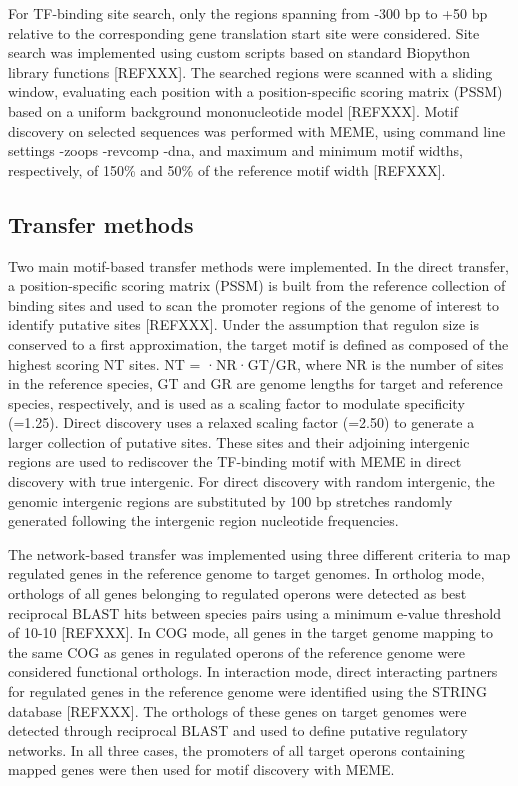 For TF-binding site search, only the regions spanning from -300 bp to +50 bp
relative to the corresponding gene translation start site were considered. Site
search was implemented using custom scripts based on standard Biopython library
functions [REFXXX]. The searched regions were scanned with a sliding window,
evaluating each position with a position-specific scoring matrix (PSSM) based
on a uniform background mononucleotide model [REFXXX]. Motif discovery on
selected sequences was performed with MEME, using command line settings -zoops
-revcomp -dna, and maximum and minimum motif widths, respectively, of 150\% and
50\% of the reference motif width [REFXXX].

\subsection{Transfer methods}

Two main motif-based transfer methods were implemented. In the direct transfer,
a position-specific scoring matrix (PSSM) is built from the reference
collection of binding sites and used to scan the promoter regions of the genome
of interest to identify putative sites [REFXXX]. Under the assumption that
regulon size is conserved to a first approximation, the target motif is defined
as composed of the highest scoring NT sites. NT = ·NR·GT/GR, where NR is the
number of sites in the reference species, GT and GR are genome lengths for
target and reference species, respectively, and is used as a scaling factor to
modulate specificity (=1.25). Direct discovery uses a relaxed scaling factor
(=2.50) to generate a larger collection of putative sites. These sites and
their adjoining intergenic regions are used to rediscover the TF-binding motif
with MEME in direct discovery with true intergenic. For direct discovery with
random intergenic, the genomic intergenic regions are substituted by 100 bp
stretches randomly generated following the intergenic region nucleotide
frequencies.

The network-based transfer was implemented using three different criteria to
map regulated genes in the reference genome to target genomes. In ortholog
mode, orthologs of all genes belonging to regulated operons were detected as
best reciprocal BLAST hits between species pairs using a minimum e-value
threshold of 10-10 [REFXXX]. In COG mode, all genes in the target genome
mapping to the same COG as genes in regulated operons of the reference genome
were considered functional orthologs. In interaction mode, direct interacting
partners for regulated genes in the reference genome were identified using the
STRING database [REFXXX]. The orthologs of these genes on target genomes were
detected through reciprocal BLAST and used to define putative regulatory
networks. In all three cases, the promoters of all target operons containing
mapped genes were then used for motif discovery with MEME.

